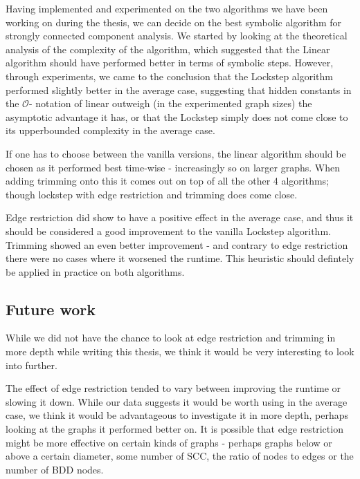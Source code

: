 \documentclass[../master/master.tex]{subfiles}
\begin{document}
Having implemented and experimented on the two algorithms we have been working on during the thesis, we can decide on the best symbolic algorithm for strongly connected component analysis. We started by looking at the theoretical analysis of the complexity of the algorithm, which suggested that the Linear algorithm should have performed better in terms of symbolic steps. However, through experiments, we came to the conclusion that the Lockstep algorithm performed slightly better in the average case, suggesting that hidden constants in the $\mathcal{O}$- notation of linear outweigh (in the experimented graph sizes) the asymptotic advantage it has, or that the Lockstep simply does not come close to its upperbounded complexity in the average case.

If one has to choose between the vanilla versions, the linear algorithm should be chosen as it performed best time-wise - increasingly so on larger graphs. When adding trimming onto this it comes out on top of all the other 4 algorithms; though lockstep with edge restriction and trimming does come close.

Edge restriction did show to have a positive effect in the average case, and thus it should be considered a good improvement to the vanilla Lockstep algorithm. Trimming showed an even better improvement - and contrary to edge restriction there were no cases where it worsened the runtime. This heuristic should defintely be applied in practice on both algorithms.

\subsection{Future work}
While we did not have the chance to look at edge restriction and trimming in more depth while writing this thesis, we think it would be very interesting to look into further.

The effect of edge restriction tended to vary between improving the runtime or slowing it down. While our data suggests it would be worth using in the average case, we think it would be advantageous to investigate it in more depth, perhaps looking at the graphs it performed better on. It is possible that edge restriction might be more effective on certain kinds of graphs - perhaps graphs below or above a certain diameter, some number of SCC, the ratio of nodes to edges or the number of BDD nodes.
\end{document}
